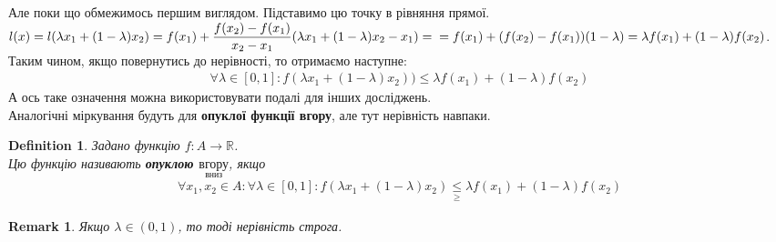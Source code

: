 \documentclass[a4paper, 14pt]{article}
\theoremstyle{theoremdd}
\theoremstyle{theoremdd}
\newtheorem{definition}[theorem]{Definition}
\theoremstyle{theoremdd}
\theoremstyle{theoremdd}
\theoremstyle{theoremdd}
\theoremstyle{theoremdd}
\newtheorem{remark}[theorem]{Remark}
\theoremstyle{theoremdd}
\theoremstyle{theoremdd}
\begin{document}
Але поки що обмежимось першим виглядом. Підставимо цю точку в рівняння прямої.\\
$l(x) = l(\lambda x_1 + (1-\lambda) x_2) = f(x_1) + \dfrac{f(x_2)-f(x_1)}{x_2-x_1} (\lambda x_1 + (1-\lambda)x_2 - x_1) = \\
= f(x_1) + (f(x_2)-f(x_1))(1-\lambda) = \lambda f(x_1) + (1-\lambda)f(x_2)$.\\
Таким чином, якщо повернутись до нерівності, то отримаємо наступне:
\begin{align*}
\forall \lambda \in [0,1]: f(\lambda x_1 + (1-\lambda)x_2)) \leq \lambda f(x_1) + (1-\lambda) f(x_2)
\end{align*}
А ось таке означення можна використовувати подалі для інших досліджень.\\
Аналогічні міркування будуть для \textbf{опуклої функції вгору}, але тут нерівність навпаки.

\begin{definition}
Задано функцію $f \colon A \to \mathbb{R}$.\\
Цю функцію називають \textbf{опуклою $\underset{\textrm{вниз}}{\textrm{вгору}}$}, якщо
\begin{align*}
\forall x_1,x_2 \in A: \forall \lambda \in [0,1]: f(\lambda x_1 + (1-\lambda)x_2) \underset{\geq}{\leq} \lambda f(x_1) + (1-\lambda)f(x_2)
\end{align*}
\end{definition}

\begin{remark}
Якщо $\lambda \in (0,1)$, то тоді нерівність строга.
\end{remark}
\end{document}
